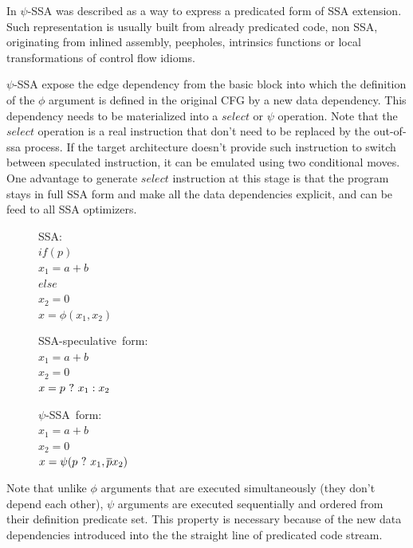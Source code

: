 In \cite{Stoutchinin:2001:ESS:563998.564022} $\psi$-SSA was described as a way to express a predicated form of SSA extension. Such representation is usually built from already predicated code, non SSA, originating from inlined assembly, peepholes, intrinsics functions or local transformations of control flow idioms. 

$\psi$-SSA expose the edge dependency from the basic block into which the definition of the $\phi$ argument is defined in the original CFG by a new data dependency. This dependency needs to be materialized into a $select$ or $\psi$ operation. Note that the $select$ operation is a real instruction that don't need to be replaced by the out-of-ssa process. If the target architecture doesn't provide such instruction to switch between speculated instruction, it can be emulated using two conditional moves. One advantage to generate $select$ instruction at this stage is that the program stays in full SSA form and make all the data dependencies explicit, and can be feed to all SSA optimizers. 

\begin{figure}
\begin{minipage}[t]{3.5cm}
\mbox{SSA:} \\
$ if (p) $ \\
$   x_1 = a+b $ \\
$ else $ \\
$   x_2 = 0 $ \\
$ x = \phi (x_1, x_2) $ \\
\end{minipage}
\begin{minipage}[t]{3.5cm}
\mbox{SSA-speculative form:} \\
$x_1 = a + b $ \\
$x_2 = 0 $ \\
$x = p ~?~  x_1 : x_2$ \\
\end{minipage}
\begin{minipage}[t]{3.5cm}
\mbox{$\psi$-SSA form:} \\
$x_1 = a + b $ \\
$x_2 = 0 $\\
$x = \psi (p ~?~ x_1, \overline{p} x_2) $ \\
\end{minipage}
\end{figure}

Note that unlike $\phi$ arguments that are executed simultaneously (they don't depend each other), $\psi$ arguments are executed sequentially and ordered from their definition predicate set. This property is necessary because of the new data dependencies introduced into the the straight line of predicated code stream.

